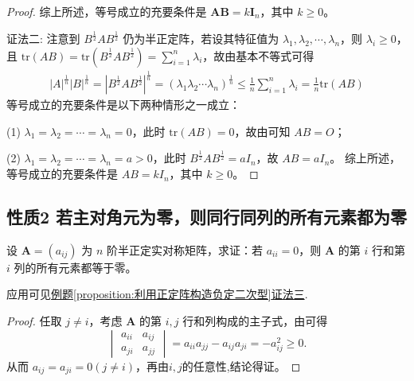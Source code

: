 \documentclass[../../main.tex]{subfiles}
\begin{document}
\begin{proof}
综上所述，等号成立的充要条件是 \(\boldsymbol{A}\boldsymbol{B}=k\boldsymbol{I}_n\)，其中 \(k\geq0\)。

{\color{blue}证法二:}
注意到 \(B^{\frac{1}{2}}AB^{\frac{1}{2}}\) 仍为半正定阵，若设其特征值为 \(\lambda_1,\lambda_2,\cdots,\lambda_n\)，则 \(\lambda_i \geq 0\)，且 \(\mathrm{tr}(AB)=\mathrm{tr}(B^{\frac{1}{2}}AB^{\frac{1}{2}})=\sum_{i = 1}^{n}\lambda_i\)，故由基本不等式可得
\begin{align*}
|A|^{\frac{1}{n}}|B|^{\frac{1}{n}} = |B^{\frac{1}{2}}AB^{\frac{1}{2}}|^{\frac{1}{n}} = (\lambda_1\lambda_2\cdots\lambda_n)^{\frac{1}{n}} \leq \frac{1}{n}\sum_{i = 1}^{n}\lambda_i = \frac{1}{n}\mathrm{tr}(AB)
\end{align*}
等号成立的充要条件是以下两种情形之一成立：

(1) \(\lambda_1 = \lambda_2 = \cdots = \lambda_n = 0\)，此时 \(\mathrm{tr}(AB) = 0\)，故由可知 \(AB = O\)；

(2) \(\lambda_1 = \lambda_2 = \cdots = \lambda_n = a > 0\)，此时 \(B^{\frac{1}{2}}AB^{\frac{1}{2}} = aI_n\)，故 \(AB = aI_n\)。
综上所述，等号成立的充要条件是 \(AB = kI_n\)，其中 \(k \geq 0\)。 
\end{proof}

\subsection{性质2 若主对角元为零，则同行同列的所有元素都为零}

\begin{proposition}\label{proposition:若主对角元为零，则同行同列的所有元素都为零}
设 \(\boldsymbol{A}=(a_{ij})\) 为 \(n\) 阶半正定实对称矩阵，求证：若 \(a_{ii}=0\)，则 \(\boldsymbol{A}\) 的第 \(i\) 行和第 \(i\) 列的所有元素都等于零。
\end{proposition}
\begin{remark}
应用可见\hyperref[proposition:利用正定阵构造负定二次型]{例题\ref{proposition:利用正定阵构造负定二次型}证法三}.
\end{remark}
\begin{proof}
任取 \(j\neq i\)，考虑 \(\boldsymbol{A}\) 的第 \(i,j\) 行和列构成的主子式，由可得
\[
\begin{vmatrix}
a_{ii}&a_{ij}\\
a_{ji}&a_{jj}
\end{vmatrix}=a_{ii}a_{jj}-a_{ij}a_{ji}=-a_{ij}^2\geq0.
\]
从而 \(a_{ij}=a_{ji}=0(j\neq i)\)，再由$i,j$的任意性,结论得证。
\end{proof}
\end{document}
